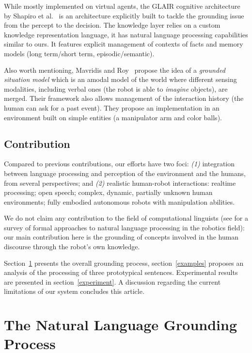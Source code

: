While mostly implemented on virtual agents, the GLAIR cognitive architecture
by Shapiro et al.~\cite{Shapiro2009} is an architecture
explicitly built to tackle the grounding issue from the percept to the
decision. The knowledge layer relies on a custom knowledge representation
language, it has natural language processing capabilities similar to ours. It
features explicit management of contexts of facts and memory models (long
term/short term, episodic/semantic).

Also worth mentioning, Mavridis and Roy~\cite{Mavridis2005} propose the idea of
a \emph{grounded situation model} which is an amodal model of the world where
different sensing modalities, including verbal ones (the robot is able to
\emph{imagine} objects), are merged. Their framework also allows management of
the interaction history (the human can ask for a past event). They propose an
implementation in an environment built on simple entities (a manipulator arm
and color balls).

\subsection{Contribution}

Compared to previous contributions, our efforts have two foci: {\it (1)}
integration between language processing and perception of the environment and
the humans, from several perspectives; and {\it (2)} realistic human-robot interactions:
realtime processing; open speech; complex, dynamic, partially unknown human environments; fully
embodied autonomous robots with manipulation abilities. 

We do not claim any contribution to the field of computational linguists (see
\cite{Kruijff2010} for a survey of formal approaches to natural language
processing in the robotics field): our main contribution here is the grounding
of concepts involved in the human discourse through the robot's own knowledge.

Section~\ref{dialog} presents the overall grounding process, section~\ref{examples} 
proposes an analysis of the processing of three prototypical sentences. 
Experimental results are presented in section~\ref{experiment}. A 
discussion regarding the current limitations of our system concludes
this article.

\section{The Natural Language Grounding Process}
\label{dialog}

